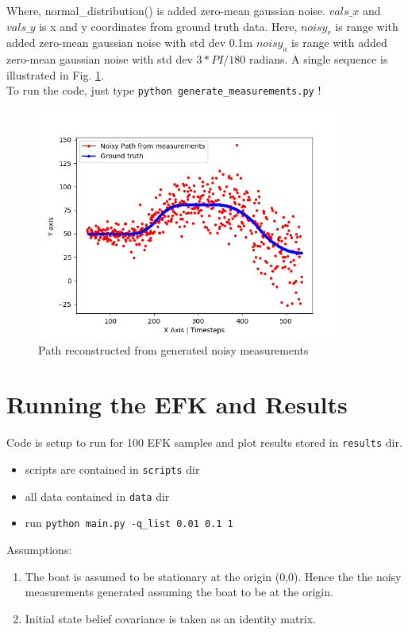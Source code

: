 \documentclass[12pt]{article}
\begin{document}
Where,  normal\_distribution()  is added zero-mean gaussian noise.  $vals\_x$ and $vals\_y$ is x and y coordinates from ground truth data. Here, $noisy_r$ is range with added zero-mean gaussian noise with std dev 0.1m
$noisy_a$ is range with added zero-mean gaussian noise with std dev $3*PI/180$ radians.
A single sequence is illustrated in Fig. \ref{fig:noisy_path_sample}.
\\
       
To run the code, just type  \texttt{python generate\_measurements.py} !

\begin{figure}[!h]
\centering
\includegraphics[width =4.0in]{../results/noisy_path_sample.png}
\caption{Path reconstructed from generated noisy measurements}
\label{fig:noisy_path_sample}
\end{figure}

       
\section{Running the  EFK and Results}
Code is setup to run for 100 EFK samples and plot results stored in \texttt{results} dir.
\begin{itemize}
\item scripts are contained in \texttt{scripts} dir
\item all data contained in \texttt{data} dir
\item run \texttt{python main.py -q\_list 0.01 0.1 1}
\end{itemize}

Assumptions:
\begin{enumerate}
\item The boat is assumed to be stationary at the origin (0,0). Hence the the noisy measurements generated assuming the boat to be at the origin.
\item Initial state belief covariance is taken as an identity matrix.

\end{enumerate}
 
\end{document}
